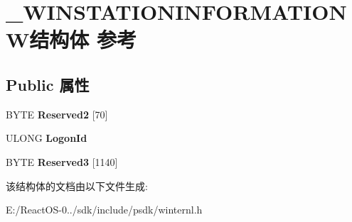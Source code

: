 \hypertarget{struct___w_i_n_s_t_a_t_i_o_n_i_n_f_o_r_m_a_t_i_o_n_w}{}\section{\+\_\+\+W\+I\+N\+S\+T\+A\+T\+I\+O\+N\+I\+N\+F\+O\+R\+M\+A\+T\+I\+O\+N\+W结构体 参考}
\label{struct___w_i_n_s_t_a_t_i_o_n_i_n_f_o_r_m_a_t_i_o_n_w}
\subsection*{Public 属性}
\begin{DoxyCompactItemize}
\item 
\mbox{\label{struct___w_i_n_s_t_a_t_i_o_n_i_n_f_o_r_m_a_t_i_o_n_w_a18485d3ecd6fb54292e678f1a485b961}} 
B\+Y\+TE {\bfseries Reserved2} \mbox{[}70\mbox{]}
\item 
\mbox{\label{struct___w_i_n_s_t_a_t_i_o_n_i_n_f_o_r_m_a_t_i_o_n_w_afcbb434975cd82cb14a83bedd7e7893a}} 
U\+L\+O\+NG {\bfseries Logon\+Id}
\item 
\mbox{\label{struct___w_i_n_s_t_a_t_i_o_n_i_n_f_o_r_m_a_t_i_o_n_w_a846713fe0798b08f568140e12e408374}} 
B\+Y\+TE {\bfseries Reserved3} \mbox{[}1140\mbox{]}
\end{DoxyCompactItemize}


该结构体的文档由以下文件生成\+:\begin{DoxyCompactItemize}
\item 
E\+:/\+React\+O\+S-\/0../sdk/include/psdk/winternl.\+h\end{DoxyCompactItemize}
